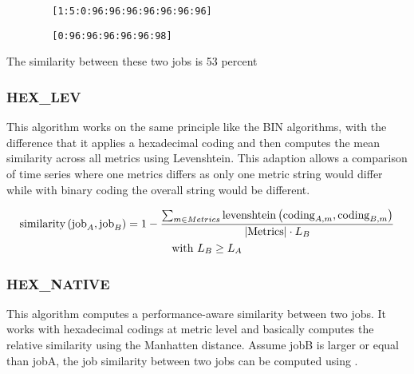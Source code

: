 \documentclass{jhps}
\begin{document}
\begin{listing}
	\noindent\begin{minipage}{0.49\textwidth}
		\begin{lstlisting}
		[1:5:0:96:96:96:96:96:96:96]
		\end{lstlisting}
		\vspace{-2em}
		\label{lst:sim:bin_aggzeros:job_a}
	\end{minipage}
	\noindent\begin{minipage}{0.49\textwidth}
		\begin{lstlisting}
		[0:96:96:96:96:96:98]
		\end{lstlisting}
		\vspace{-2em}
		\label{lst:sim:bin_aggzeros:job_b}
	\end{minipage}
	\caption{The similarity between these two jobs is 53 percent}
	\label{lst:sim:bin_aggzeros}
\end{listing}

\subsubsection{HEX\_LEV}
This algorithm works on the same principle like the BIN algorithms, with the difference that it applies a hexadecimal coding and then computes the mean similarity across all metrics using Levenshtein.
This adaption allows a comparison of time series where one metrics differs as only one metric string would differ while with binary coding the overall string would be different.

\begin{multline}
	\text{similarity}\left(\text{job}_{A},\text{job}_{B} \right) = 1 -\frac{ \sum_{m \in Metrics}^{} \text{levenshtein} \left(\text{coding}_{A,m},\text{\text{coding}}_{B,m} \right) }{|\text{Metrics}| \cdot L_{B}} \\
	\text{with } L_{B} \geq L_{A}
\end{multline}

\subsubsection{HEX\_NATIVE}
This algorithm computes a performance-aware similarity between two jobs.
It works with hexadecimal codings at metric level and basically computes the relative similarity using the Manhatten distance.
Assume jobB is larger or equal than jobA, the job similarity between two jobs can be computed using .
\end{document}
